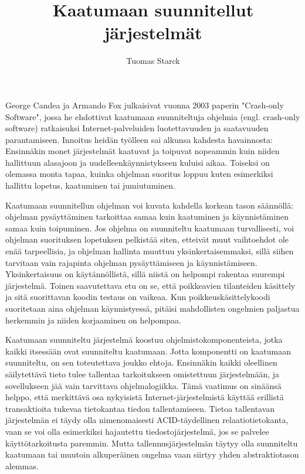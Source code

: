 \documentclass[a4paper,12pt]{article}
\begin{document}
\title{Kaatumaan suunnitellut järjestelmät}
\author{Tuomas Starck}
\maketitle

\vspace{5.5em}

George Candea ja Armando Fox julkaisivat vuonna 2003 paperin "Crash-only Software"\cite{cos}, jossa he ehdottivat kaatumaan suunniteltuja oh\-jel\-mi\-a (engl. crash-only software) ratkaisuksi Internet-palveluiden luotettavuuden ja saatavuuden parantamiseen. Innoitus heidän työlleen sai alkunsa kahdesta havainnosta: Ensinnäkin monet järjestelmät kaatuvat ja toipuvat nopeammin kuin niiden hallittuun alasajoon ja uudelleenkäynnistykseen kuluisi aikaa. Toiseksi on olemassa monta tapaa, kuinka ohjelman suoritus loppuu kuten esimerkiksi hallittu lopetus, kaatuminen tai jumiutuminen.

Kaatumaan suunnitellun ohjelman voi kuvata kahdella korkean tason säännöllä: ohjelman pysäyttäminen tarkoittaa samaa kuin kaatuminen ja käynnistäminen samaa kuin toipuminen. Jos ohjelma on suunniteltu kaatumaan turvallisesti, voi ohjelman suorituksen lopetuksen pelkistää siten, etteivät muut vaihtoehdot ole enää tarpeellisia, ja ohjelman hallinta muuttuu yksinkertaisemmaksi, sillä siihen tarvitaan vain rajapinta ohjelman pysäyttämiseen ja käynnistämiseen. Yksinkertaisuus on käytännöllistä, sillä niistä on helpompi rakentaa suurempi järjestelmä. Toinen saavutettava etu on se, että poikkeavien tilanteiden käsittely ja sitä suorittavan koodin testaus on vaikeaa. Kun poikkeuskäsittelykoodi suoritetaan aina ohjelman käynnistyessä, pitäisi mahdollisten ongelmien paljastua herkemmin ja niiden korjaaminen on helpompaa.

Kaatumaan suunniteltu järjestelmä koostuu ohjelmistokomponenteista, jotka kaikki itsessään ovat suunniteltu kaatumaan. Jotta komponentti on kaatumaan suunniteltu, on sen toteutettava joukko ehtoja. Ensinnäkin kaikki oleellinen säilytettävä tieto tulee tallentaa tarkoitukseen omistettuun järjestelmään, ja sovellukseen jää vain tarvittava ohjelmalogiikka. Tämä vaatimus on sinäänsä helppo, että merkittävä osa nykyisistä Internet-järjestelmistä käyttää erillistä transaktioita tukevaa tietokantaa tiedon tallentamiseen. Tietoa tallentavan järjestelmän ei täydy olla nimenomaisesti ACID-täydellinen relaatiotietokanta, vaan se voi olla esimerkiksi hajautettu tiedostojärjestelmä, jos se palvelee käyttötarkoitusta paremmin. Mutta tallennusjärjestelmän täytyy olla suunniteltu kaatumaan tai muutoin alkuperäinen ongelma vaan siirtyy yhden abstraktiotason alemmas.
\end{document}
